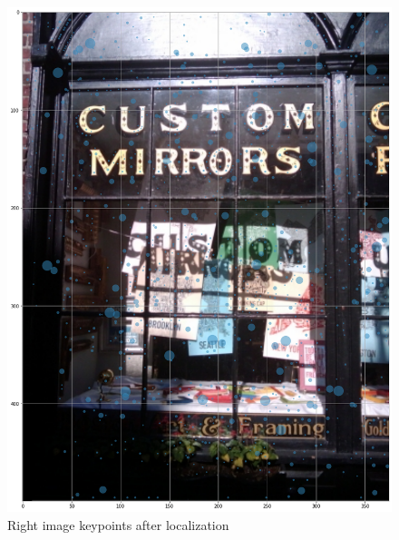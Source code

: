 \documentclass[]{article}
\begin{document}
\begin{figure}[htb]
	\centering
	\includegraphics[width=\linewidth]{CustomMirrorsRightStep2}
	\caption{Right image keypoints after localization}
	\label{custommirrorsrightstep2}
\end{figure}
\end{document}
